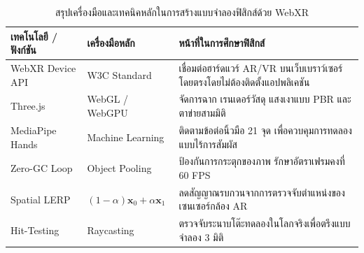 \begin{table}[H]
\centering
\caption{สรุปเครื่องมือและเทคนิคหลักในการสร้างแบบจำลองฟิสิกส์ด้วย WebXR}
\label{tab:ar_xr_summary_intro}
\small
\begin{tabularx}{\textwidth}{l >{\centering\arraybackslash}p{3.8cm} Y}
\toprule
\textbf{เทคโนโลยี / ฟังก์ชัน} & \textbf{เครื่องมือหลัก} & \textbf{หน้าที่ในการศึกษาฟิสิกส์} \\
\midrule
WebXR Device API & W3C Standard & เชื่อมต่อฮาร์ดแวร์ AR/VR บนเว็บเบราว์เซอร์โดยตรงโดยไม่ต้องติดตั้งแอปพลิเคชัน \\
Three.js & WebGL / WebGPU & จัดการฉาก เรนเดอร์วัสดุ แสงเงาแบบ PBR และตาข่ายสามมิติ \\
MediaPipe Hands & Machine Learning & ติดตามข้อต่อนิ้วมือ 21 จุด เพื่อควบคุมการทดลองแบบไร้การสัมผัส \\
Zero-GC Loop & Object Pooling & ป้องกันการกระตุกของภาพ รักษาอัตราเฟรมคงที่ 60 FPS \\
Spatial LERP & $(1-\alpha)\mathbf{x}_0 + \alpha\mathbf{x}_1$ & ลดสัญญาณรบกวนจากการตรวจจับตำแหน่งของเซนเซอร์กล้อง AR \\
Hit-Testing & Raycasting & ตรวจจับระนาบโต๊ะทดลองในโลกจริงเพื่อตรึงแบบจำลอง 3 มิติ \\
\bottomrule
\end{tabularx}
\end{table}

\newpage
